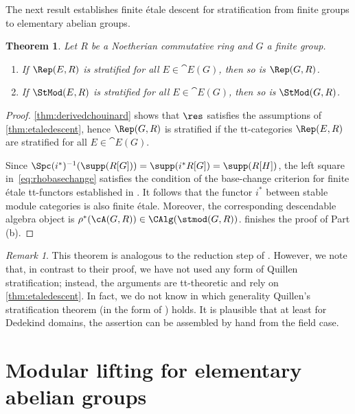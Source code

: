 \documentclass{amsart}%
\numberwithin{equation}{section}%
\newtheorem{Thm}[equation]{Theorem}
\theoremstyle{remark}
\newtheorem{Rem}[equation]{Remark}
\newcounter{enum-resume-hack}
\begin{document}
The next result establishes finite \'etale descent for stratification from finite groups to elementary abelian groups. 

\begin{Thm}\label{thm:descenttoelab}
Let $R$ be a Noetherian commutative ring and $G$ a finite group. 
\begin{enumerate}
    \item If $\Rep(E,R)$ is stratified for all $E \in \cat E(G)$, then so is $\Rep(G,R)$.
    \item If $\StMod(E,R)$ is stratified for all $E \in \cat E(G)$, then so is $\StMod(G,R)$.
\end{enumerate}
\end{Thm}
\begin{proof}
\cref{thm:derivedchouinard} shows that $\res$ satisfies the assumptions of \cref{thm:etaledescent}, hence $\Rep(G,R)$ is stratified if the tt-categories $\Rep(E,R)$ are stratified for all $E \in \cat E(G)$.

Since $\Spc(i^*)^{-1}(\supp(R[G])) = \supp(i^*R[G]) = \supp(R[H])$, the left square in~\eqref{eq:rhobasechange} satisfies the condition of the base-change criterion for finite \'etale tt-functors established in \cite[Ex.~5.12]{Sanders21pp}. It follows that the functor $i^*$ between stable module categories is also finite \'etale. Moreover, the corresponding descendable algebra object is $\rho^*(\cA(G,R)) \in \CAlg(\stmod(G,R))$.  finishes the proof of Part (b).
\end{proof}

\begin{Rem}
This theorem is analogous to the reduction step of \cite{BensonIyengarKrause11a}. However, we note that, in contrast to their proof, we have not used any form of Quillen stratification; instead, the arguments are tt-theoretic and rely on \cref{thm:etaledescent}. In fact, we do not know in which generality Quillen's stratification theorem (in the form of \cite[Thm.~10.2]{Quillen71}) holds. It is plausible that at least for Dedekind domains, the assertion can be assembled by hand from the field case.
\end{Rem}



\section{Modular lifting for elementary abelian groups}
\end{document}
